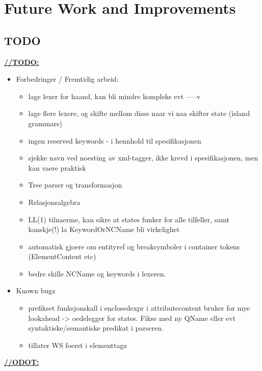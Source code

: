\chapter{Future Work and Improvements}
\label{sect:summary:future_work}




\section{TODO}
\underline{\textbf{\LARGE //TODO:}}
\begin{itemize}
	\item Forbedringer / Fremtidig arbeid:
	\begin{itemize}
		\item lage lexer for haand, kan bli mindre kompleks evt -----v
		\item lage flere lexere, og skifte mellom disse naar vi naa skifter state (island grammars)
		\item ingen reserved keywords - i hennhold til spesifikasjonen
		\item sjekke navn ved noesting av xml-tagger, ikke krevd i spesifikasjonen, men kan vaere praktisk
		\item Tree parser og transformasjon
		\item Relasjonsalgebra
		\item LL(1) tilnaerme, kan sikre at states funker for alle tilfeller, samt kanskje(!) la KeywordOrNCName bli virkelighet
		\item automatisk gjoere om entityref og breaksymboler i container tokens (ElementContent etc)
		\item bedre skille NCName og keywords i lexeren.
	\end{itemize}

	\item Known bugz
	\begin{itemize}
		\item prefikset funksjonskall i enclosedexpr i attributecontent bruker for mye lookahead -> oedelegger for states. Fikse med ny QName eller evt syntaktiske/semantiske predikat i parseren.
		\item tillater WS foerst i elementtagz
	\end{itemize}
	
\end{itemize}

\underline{\textbf{\LARGE //ODOT:}}
